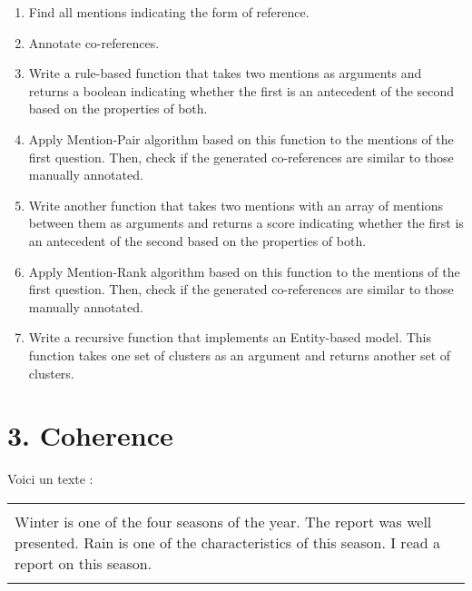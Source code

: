 \documentclass[11pt, a4paper]{article}
\begin{document}
\begin{enumerate}
	\item Find all mentions indicating the form of reference.
	\item Annotate co-references.
	\item Write a rule-based function that takes two mentions as arguments and returns a boolean indicating whether the first is an antecedent of the second based on the properties of both.
	\item Apply Mention-Pair algorithm based on this function to the mentions of the first question.
	Then, check if the generated co-references are similar to those manually annotated.
	\item Write another function that takes two mentions with an array of mentions between them as arguments and returns a score indicating whether the first is an antecedent of the second based on the properties of both.
	\item Apply Mention-Rank algorithm based on this function to the mentions of the first question.
	Then, check if the generated co-references are similar to those manually annotated.
	\item Write a recursive function that implements an Entity-based model. 
	This function takes one set of clusters as an argument and returns another set of clusters.
\end{enumerate}

\section*{3. Coherence}

Voici un texte : 

\begin{center}
	\begin{tabular}{|p{}|}
	\hline
	\\
	Winter is one of the four seasons of the year. The report was well presented.
	Rain is one of the characteristics of this season.
	I read a report on this season. \\
	\\
	\hline 
\end{tabular}
\end{center}
\end{document}
